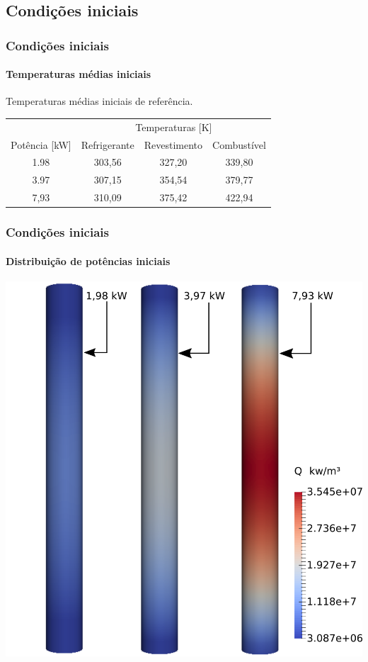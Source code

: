 \documentclass[svgnames,smaller,table]{beamer}
\begin{document}
\subsection{Condições iniciais}
\begin{frame}
  \frametitle{Condições iniciais}
  \framesubtitle{Temperaturas médias iniciais}
  
    \centering
    Temperaturas médias iniciais de referência.
    \label{tab:temp-keff}
    \begin{tabular}{cccc}
      \multicolumn{1}{l}{}         & \multicolumn{3}{c}{Temperaturas [K]}                                                                        \\ \cline{2-4}
      \multicolumn{1}{c}{Potência [kW]} & \multicolumn{1}{c}{Refrigerante} & \multicolumn{1}{c}{Revestimento} & \multicolumn{1}{c}{Combustível}  \\ \hline
      1.98                      & 303,56                         & 327,20                         & 339,80                           \\ \hline
      3.97                      & 307,15                         & 354,54                         & 379,77                           \\ \hline
      7,93                      & 310,09                         & 375,42                         & 422,94                                         
    \end{tabular}
\end{frame}

\begin{frame}
  \frametitle{Condições iniciais}
  \framesubtitle{Distribuição de potências iniciais}
  \centering\includegraphics[scale=0.4]{../figuras/Q_fuel_all_NC.png}
\end{frame}
\end{document}
